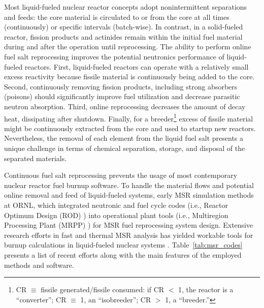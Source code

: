 Most liquid-fueled nuclear reactor concepts adopt nonintermittent separations 
and feeds: the core material is circulated to or from the core at all times 
(continuously) or specific intervals (batch-wise). In contrast, in a 
solid-fueled reactor, fission products and actinides remain within the initial 
fuel material during and after the operation until reprocessing. The ability 
to perform online fuel salt reprocessing improves the potential neutronics 
performance of liquid-fueled reactors. First, liquid-fueled reactors can 
operate with a relatively small excess reactivity because fissile material is 
continuously being added to the core. Second, continuously removing fission 
products, including strong absorbers (poisons) should significantly improve 
fuel utilization and decrease parasitic neutron absorption. Third, online 
reprocessing decreases the amount of decay heat, dissipating after shutdown.
Finally, for a breeder\footnote{\gls{CR} 
	$\equiv$ fissile generated/fissile consumed: if CR $<$ 1, the reactor is a 
	``converter''; CR $\equiv$ 1, an ``isobreeder''; CR $>$ 1, a 
	``breeder.''} excess of fissile material might be continuously extracted  
from the core and used to startup new reactors. Nevertheless, the removal of 
each element from the liquid fuel salt presents a unique challenge in terms of 
chemical separation, storage, and disposal of the separated materials.

Continuous fuel salt reprocessing prevents the usage of most contemporary 
nuclear reactor fuel burnup software. To handle the material flows and 
potential online removal and feed of liquid-fueled systems, early \gls{MSR} 
simulation methods at \gls{ORNL}, which integrated neutronic and fuel cycle 
codes (i.e., Reactor Optimum Design (ROD) \cite{bauman_rod_1971}) into 
operational plant tools (i.e., Multiregion Processing Plant (MRPP) 
\cite{kee_mrpp_1976}) for \gls{MSR} fuel reprocessing system design. Extensive 
research efforts in fast and thermal MSR analysis has yielded workable tools 
for burnup calculations in liquid-fueled nuclear systems  
\cite{fiorina_investigation_2013, sheu_depletion_2013, aufiero_extended_2013,
heuer_towards_2014, park_whole_2015, betzler_molten_2017, 
betzler_molten_2019}. Table~\ref{tab:msr_codes} presents a list of recent 
efforts along with the main features of the employed methods and software.
\FloatBarrier

